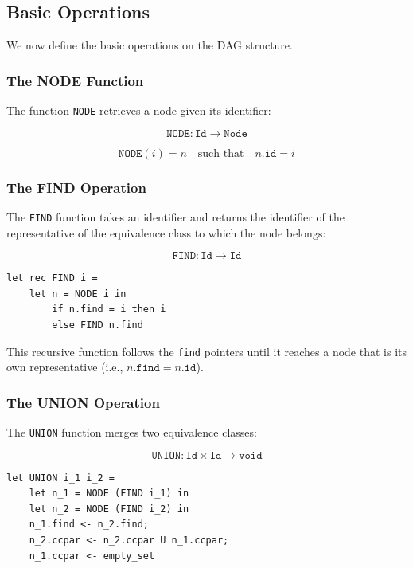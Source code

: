 \documentclass[11pt,a4paper]{article}
\theoremstyle{definition}
\theoremstyle{plain}
\theoremstyle{remark}
\begin{document}
\subsection{Basic Operations}

We now define the basic operations on the DAG structure.

\subsubsection{The NODE Function}

The function \texttt{NODE} retrieves a node given its identifier:

\[
\texttt{NODE} : \texttt{Id} \rightarrow \texttt{Node}
\]

\[
\texttt{NODE}(i) = n \quad \text{such that} \quad n.\texttt{id} = i
\]

\subsubsection{The FIND Operation}

The \texttt{FIND} function takes an identifier and returns the identifier of the representative of the equivalence class to which the node belongs:

\[
\texttt{FIND} : \texttt{Id} \rightarrow \texttt{Id}
\]

\begin{verbatim}
let rec FIND i = 
    let n = NODE i in 
        if n.find = i then i 
        else FIND n.find
\end{verbatim}

This recursive function follows the \texttt{find} pointers until it reaches a node that is its own representative (i.e., $n.\texttt{find} = n.\texttt{id}$).

\subsubsection{The UNION Operation}

The \texttt{UNION} function merges two equivalence classes:

\[
\texttt{UNION} : \texttt{Id} \times \texttt{Id} \rightarrow \texttt{void}
\]

\begin{verbatim}
let UNION i_1 i_2 = 
    let n_1 = NODE (FIND i_1) in 
    let n_2 = NODE (FIND i_2) in 
    n_1.find <- n_2.find;
    n_2.ccpar <- n_2.ccpar U n_1.ccpar;
    n_1.ccpar <- empty_set
\end{verbatim}
\end{document}
